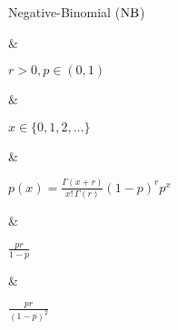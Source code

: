 Negative-Binomial ($\operatorname{NB}$)

&

$r > 0, p \in (0, 1)$

& 

$x \in \{0, 1, 2, \dotsc\}$

&

\(\displaystyle
	p(x) = \frac{\Gamma(x + r)}{x!\,\Gamma(r)} (1 - p)^r p^x
\)

& 

$\frac{pr}{1 - p}$

&

$\frac{pr}{(1 - p)^2}$